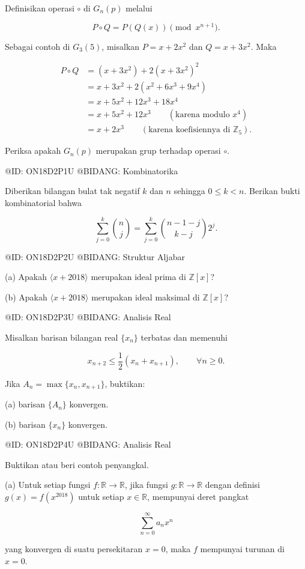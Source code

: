 Definisikan operasi $\circ$ di $G_n(p)$ melalui

$$
P\circ Q=P(Q(x))
\pmod{x^{n+1}}.
$$

Sebagai contoh di $G_3(5)$, misalkan $P=x+2x^2$ dan $Q=x+3x^2$. Maka

$$
\begin{aligned}
P\circ Q
&=(x+3x^2)+2(x+3x^2)^2\\
&=x+3x^2+2(x^2+6x^3+9x^4)\\
&=x+5x^2+12x^3+18x^4\\
&=x+5x^2+12x^3
\qquad(\text{karena modulo }x^4)\\
&=x+2x^3
\qquad(\text{karena koefisiennya di }\mathbb Z_5).
\end{aligned}
$$

Periksa apakah $G_n(p)$ merupakan grup terhadap operasi $\circ$.

@ID: ON18D2P1U
@BIDANG: Kombinatorika

Diberikan bilangan bulat tak negatif $k$ dan $n$ sehingga $0\le k<n$. Berikan bukti kombinatorial bahwa

$$
\sum_{j=0}^{k}\binom{n}{j}
=
\sum_{j=0}^{k}\binom{n-1-j}{k-j}2^j.
$$

@ID: ON18D2P2U
@BIDANG: Struktur Aljabar

(a) Apakah $\langle x+2018\rangle$ merupakan ideal prima di $\mathbb Z[x]$?

(b) Apakah $\langle x+2018\rangle$ merupakan ideal maksimal di $\mathbb Z[x]$?

@ID: ON18D2P3U
@BIDANG: Analisis Real

Misalkan barisan bilangan real $\{x_n\}$ terbatas dan memenuhi

$$
x_{n+2}\le\frac12(x_n+x_{n+1}),\qquad \forall n\ge0.
$$

Jika $A_n=\max\{x_n,x_{n+1}\}$, buktikan:

(a) barisan $\{A_n\}$ konvergen.

(b) barisan $\{x_n\}$ konvergen.

@ID: ON18D2P4U
@BIDANG: Analisis Real

Buktikan atau beri contoh penyangkal.

(a) Untuk setiap fungsi $f:\mathbb R\to\mathbb R$, jika fungsi $g:\mathbb R\to\mathbb R$ dengan definisi $g(x)=f(x^{2018})$ untuk setiap $x\in\mathbb R$, mempunyai deret pangkat

$$
\sum_{n=0}^{\infty}a_nx^n
$$

yang konvergen di suatu persekitaran $x=0$, maka $f$ mempunyai turunan di $x=0$.

